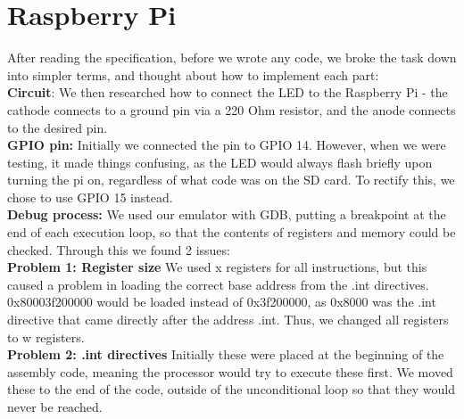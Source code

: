 \documentclass[11pt]{article}
\begin{document}
\section{Raspberry Pi}
After reading the specification, before we wrote any code, we broke the task down into simpler terms, and thought about how to implement each part:\\
\textbf{Circuit}: We then researched how to connect the LED to the Raspberry Pi - the cathode connects to a ground pin via a 220 Ohm resistor, and the anode connects to the desired pin.\\
\textbf{GPIO pin:} Initially we connected the pin to GPIO 14. However, when we were testing, it made things confusing, as the LED would always flash briefly upon turning the pi on, regardless of what code was on the SD card. To rectify this, we chose to use GPIO 15 instead. \\
\textbf{Debug process:} We used our emulator with GDB, putting a breakpoint at the end of each execution loop, so that the contents of registers and memory could be checked. Through this we found 2 issues:\\
\textbf{Problem 1: Register size} We used x registers for all instructions, but this caused a problem in loading the correct base address from the .int directives. 0x80003f200000 would be loaded instead of 0x3f200000, as 0x8000 was the .int  directive that came directly after the address .int. Thus, we changed all registers to w registers.\\
\textbf{Problem 2: .int directives} Initially these were placed at the beginning of the assembly code, meaning the processor would try to execute these first. We moved these to the end of the code, outside of the unconditional loop so that they would never be reached.
\end{document}
